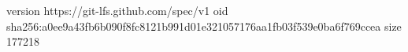 version https://git-lfs.github.com/spec/v1
oid sha256:a0ee9a43fb6b090f8fc8121b991d01e321057176aa1fb03f539e0ba6f769ccea
size 177218
